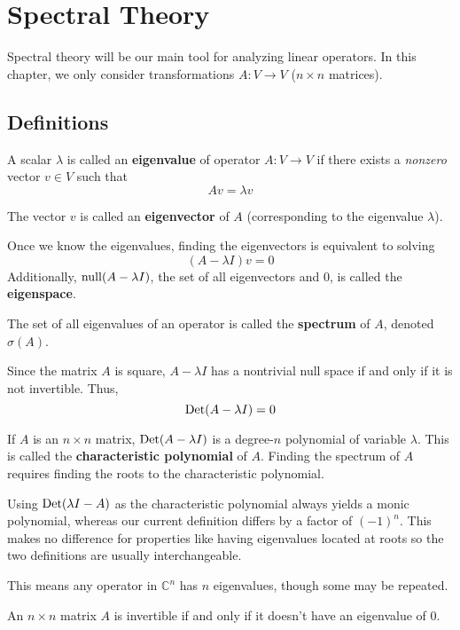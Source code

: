 \chapter{Spectral Theory}
Spectral theory will be our main tool for analyzing linear operators. In this chapter, we only consider transformations $A: V \rightarrow V$ ($n \times n$ matrices). 

\section{Definitions}

\begin{definition}
A scalar $\lambda$ is called an \textbf{eigenvalue} of operator $A: V \rightarrow V$ if there exists a \textit{nonzero} vector $v \in V$ such that 
$$Av = \lambda v$$

The vector $v$ is called an \textbf{eigenvector} of $A$ (corresponding to the eigenvalue $\lambda$).

Once we know the eigenvalues, finding the eigenvectors is equivalent to solving 
$$(A - \lambda I)v = 0$$
Additionally, $\operatorname{null}(A - \lambda I)$, the set of all eigenvectors and 0, is called the \textbf{eigenspace}. 

The set of all eigenvalues of an operator is called the \textbf{spectrum} of $A$, denoted $\sigma (A)$. 
\end{definition}

Since the matrix $A$ is square, $A - \lambda I$ has a nontrivial null space if and only if it is not invertible. Thus,
$$\operatorname{Det}(A - \lambda I) = 0$$

\begin{definition}
If $A$ is an $n \times n$ matrix, $\operatorname{Det}(A - \lambda I)$ is a degree-$n$ polynomial of variable $\lambda$. This is called the \textbf{characteristic polynomial} of $A$. Finding the spectrum of $A$ requires finding the roots to the characteristic polynomial. 

Using $\operatorname{Det}(\lambda I - A)$ as the characteristic polynomial always yields a monic polynomial, whereas our current definition differs by a factor of $(-1)^{n}$. This makes no difference for properties like having eigenvalues located at roots so the two definitions are usually interchangeable. 

This means any operator in $\mathbb{C}^{n}$ has $n$ eigenvalues, though some may be repeated. 
\end{definition}

\begin{theorem}
An $n \times n$ matrix $A$ is invertible if and only if it doesn't have an eigenvalue of 0. 
\end{theorem}

